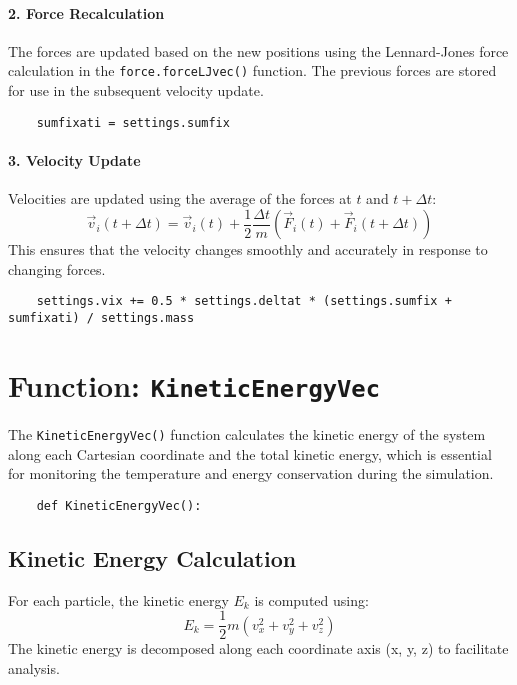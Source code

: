 \documentclass[12pt, ngerman]{report}
\begin{document}
\paragraph{2. Force Recalculation}
The forces are updated based on the new positions using the Lennard-Jones force calculation in the \texttt{force.forceLJvec()} function. The previous forces are stored for use in the subsequent velocity update.

\begin{verbatim}
	sumfixati = settings.sumfix
\end{verbatim}

\paragraph{3. Velocity Update}
Velocities are updated using the average of the forces at \(t\) and \(t + \Delta t\):
\[
\vec{v}_i(t + \Delta t) = \vec{v}_i(t) + \frac{1}{2} \frac{\Delta t}{m} \left( \vec{F}_i(t) + \vec{F}_i(t + \Delta t) \right)
\]
This ensures that the velocity changes smoothly and accurately in response to changing forces.

\begin{verbatim}
	settings.vix += 0.5 * settings.deltat * (settings.sumfix + sumfixati) / settings.mass
\end{verbatim}

\section{Function: \texttt{KineticEnergyVec}}
\label{sec:kineticenergyvec}

The \texttt{KineticEnergyVec()} function calculates the kinetic energy of the system along each Cartesian coordinate and the total kinetic energy, which is essential for monitoring the temperature and energy conservation during the simulation.

\begin{verbatim}
	def KineticEnergyVec():
\end{verbatim}

\subsection*{Kinetic Energy Calculation}
For each particle, the kinetic energy \(E_k\) is computed using:
\[
E_k = \frac{1}{2} m \left( v_{x}^2 + v_{y}^2 + v_{z}^2 \right)
\]
The kinetic energy is decomposed along each coordinate axis (x, y, z) to facilitate analysis.
\end{document}
